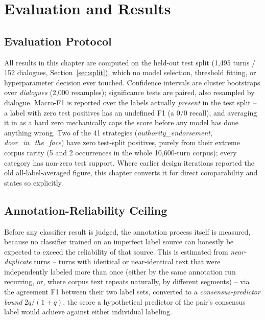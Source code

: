 \chapter{Evaluation and Results}
\label{ch:evaluation}

\section{Evaluation Protocol}

All results in this chapter are computed on the held-out test split
(1{,}495 turns / 152 dialogues, Section~\ref{sec:split}), which no model
selection, threshold fitting, or hyperparameter decision ever touched.
Confidence intervals are cluster bootstraps over \emph{dialogues} (2{,}000
resamples); significance tests are paired, also resampled by dialogue.
Macro-F1 is reported over the labels actually \emph{present} in the test
split -- a label with zero test positives has an undefined F1 (a $0/0$
recall), and averaging it in as a hard zero mechanically caps the score
before any model has done anything wrong. Two of the 41 strategies
(\textit{authority\_endorsement}, \textit{door\_in\_the\_face}) have zero
test-split positives, purely from their extreme corpus rarity (5 and 2
occurrences in the whole 10{,}600-turn corpus); every category has non-zero
test support. Where earlier design iterations reported the old
all-label-averaged figure, this chapter converts it for direct comparability
and states so explicitly.

\section{Annotation-Reliability Ceiling}
\label{sec:ceiling}

Before any classifier result is judged, the annotation process itself is
measured, because no classifier trained on an imperfect label source can
honestly be expected to exceed the reliability of that source. This is
estimated from \emph{near-duplicate} turns -- turns with identical or
near-identical text that were independently labeled more than once (either
by the same annotation run recurring, or, where corpus text repeats
naturally, by different segments) -- via the agreement F1 between their two
label sets, converted to a \emph{consensus-predictor bound}
$2q/(1+q)$, the score a hypothetical predictor of the pair's consensus label
would achieve against either individual labeling.

